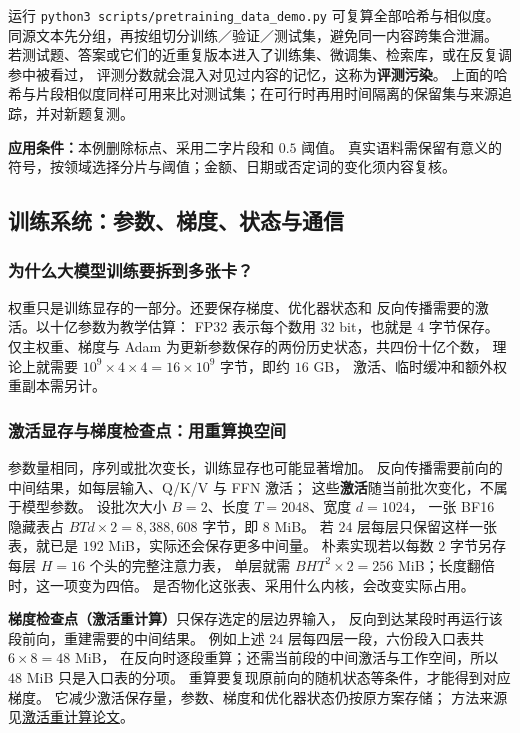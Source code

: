 运行 \texttt{python3 scripts/pretraining\_data\_demo.py} 可复算全部哈希与相似度。
同源文本先分组，再按组切分训练／验证／测试集，避免同一内容跨集合泄漏。
若测试题、答案或它们的近重复版本进入了训练集、微调集、检索库，或在反复调参中被看过，
评测分数就会混入对见过内容的记忆，这称为\textbf{评测污染}。
上面的哈希与片段相似度同样可用来比对测试集；在可行时再用时间隔离的保留集与来源追踪，并对新题复测。

\textbf{应用条件：}本例删除标点、采用二字片段和 $0.5$ 阈值。
真实语料需保留有意义的符号，按领域选择分片与阈值；金额、日期或否定词的变化须内容复核。

\subsection{训练系统：参数、梯度、状态与通信}
\subsubsection*{为什么大模型训练要拆到多张卡？}

权重只是训练显存的一部分。还要保存梯度、优化器状态和
反向传播需要的激活。以十亿参数为教学估算：
FP32 表示每个数用 $32$ bit，也就是 $4$ 字节保存。
仅主权重、梯度与 Adam 为更新参数保存的两份历史状态，共四份十亿个数，
理论上就需要 $10^9\times4\times4=16\times10^9$ 字节，即约 $16$ GB，
激活、临时缓冲和额外权重副本需另计。

\subsubsection*{激活显存与梯度检查点：用重算换空间}
参数量相同，序列或批次变长，训练显存也可能显著增加。
反向传播需要前向的中间结果，如每层输入、Q/K/V 与 FFN 激活；
这些\textbf{激活}随当前批次变化，不属于模型参数。
设批次大小 $B=2$、长度 $T=2048$、宽度 $d=1024$，
一张 BF16 隐藏表占 $BTd\times2=8{,}388{,}608$ 字节，即 $8$ MiB。
若 $24$ 层每层只保留这样一张表，就已是 $192$ MiB，实际还会保存更多中间量。
朴素实现若以每数 $2$ 字节另存每层 $H=16$ 个头的完整注意力表，
单层就需 $BHT^2\times2=256$ MiB；长度翻倍时，这一项变为四倍。
是否物化这张表、采用什么内核，会改变实际占用。

\label{concept:activation-checkpoint}%
\textbf{梯度检查点（激活重计算）}只保存选定的层边界输入，
反向到达某段时再运行该段前向，重建需要的中间结果。
例如上述 $24$ 层每四层一段，六份段入口表共 $6\times8=48$ MiB，
在反向时逐段重算；还需当前段的中间激活与工作空间，所以 $48$ MiB 只是入口表的分项。
重算要复现原前向的随机状态等条件，才能得到对应梯度。
它减少激活保存量，参数、梯度和优化器状态仍按原方案存储；
方法来源见\hyperref[source:activation-checkpoint]{激活重计算论文}。

